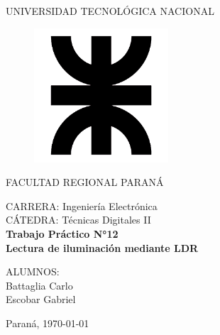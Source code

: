 \documentclass[a4paper, 12pt]{article}
\begin{document}
\begin{titlepage}
	\begin{center}
		{\large{UNIVERSIDAD TECNOLÓGICA NACIONAL}}
	\end{center}
	\vspace{15pt}
	\begin{figure}[!ht]
		\centering
		\begin{center}
			\includegraphics[width=5cm]{utn.png}
		\end{center}
	\end{figure}
	\vspace{5pt}
	\begin{center}
		{\large{FACULTAD REGIONAL PARANÁ}}
		\vspace{5pt}
		\begin{center}
			\vspace{15pt}
			\normalsize{CARRERA: Ingeniería Electrónica\\
						CÁTEDRA: Técnicas Digitales II\\}
			\vspace{50pt}
			\huge\bfseries{Trabajo Práctico N°12\\
			Lectura de iluminación mediante LDR\\}
			\vspace{50pt}
		\end{center}
		
		\begin{flushleft}
			\begin{center}
				ALUMNOS:\\
				Battaglia Carlo\\
				Escobar Gabriel\\
			\end{center}
		\end{flushleft}
		
		\begin{center}
			\vspace{\fill}
			\normalsize{Paraná,}
			\today
		\end{center}
	\end{center}
\end{titlepage}
\end{document}
